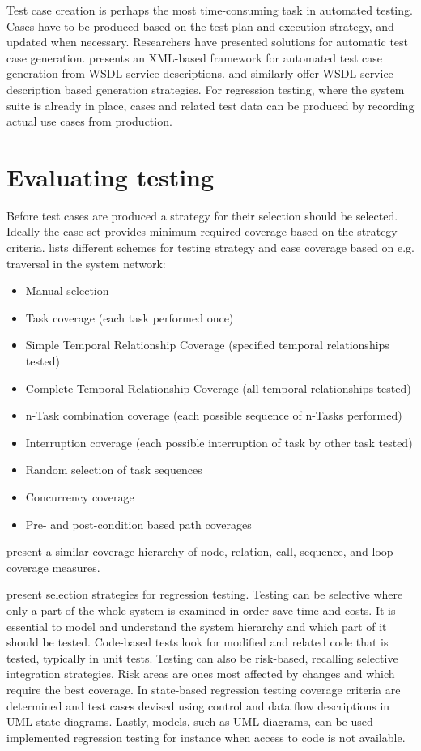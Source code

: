 \documentclass[12pt,a4paper,oneside,pdftex]{report}
\begin{document}
{{Test case creation is perhaps the most time-consuming task in automated testing. Cases have to be produced based on the test plan and execution strategy, and updated when necessary. Researchers have presented solutions for automatic test case generation. \citet{tsai2002coyote} presents an XML-based framework for automated test case generation from WSDL service descriptions. \citet{bai2005WSDL} and \citet{di2007web} similarly offer WSDL service description based generation strategies. For regression testing, where the system suite is already in place, cases and related test data can be produced by recording actual use cases from production.

\section{Evaluating testing}

Before test cases are produced a strategy for their selection should be selected. Ideally the case set provides minimum required coverage based on the strategy criteria. \citet{benz2007combining} lists different schemes for testing strategy and case coverage based on e.g. traversal in the system network:
\begin{itemize}
\item Manual selection
\item Task coverage (each task performed once)
\item Simple Temporal Relationship Coverage (specified temporal relationships tested)
\item Complete Temporal Relationship Coverage (all temporal relationships tested)
\item n-Task combination coverage (each possible sequence of n-Tasks performed)
\item Interruption coverage (each possible interruption of task by other task tested)
\item Random selection of task sequences
\item Concurrency coverage
\item Pre- and post-condition based path coverages
\end{itemize}

\citet{linnenkugel1990test} present a similar coverage hierarchy of node, relation, call, sequence, and loop coverage measures.

\citet{bhuyan2012survey} present selection strategies for regression testing. Testing can be selective where only a part of the whole system is examined in order save time and costs. It is essential to model and understand the system hierarchy and which part of it should be tested. Code-based tests look for modified and related code that is tested, typically in unit tests. Testing can also be risk-based, recalling selective integration strategies. Risk areas are ones most affected by changes and which require the best coverage. In state-based regression testing coverage criteria are determined and test cases devised using control and data flow descriptions in UML state diagrams. Lastly, models, such as UML diagrams, can be used implemented regression testing for instance when access to code is not available. \citep{bhuyan2012survey}

}}
\end{document}

